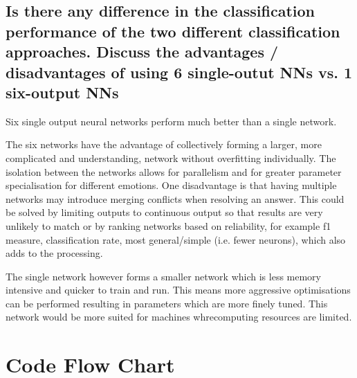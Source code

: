\documentclass[11pt]{article}
\begin{document}
\subsection{Is there any difference in the classification performance of the two different classification approaches. Discuss the advantages / disadvantages of using 6 single-outut NNs vs. 1 six-output NNs}

Six single output neural networks perform much better than a single network. 

The six networks have the advantage of collectively forming a larger, more complicated and understanding, network without overfitting individually. The isolation between the networks allows for parallelism and for greater parameter specialisation for different emotions. One disadvantage is that having multiple networks may introduce merging conflicts when resolving an answer. This could be solved by limiting outputs to continuous output so that results are very unlikely to match or by ranking networks based on reliability, for example f1 measure, classification rate, most general/simple (i.e. fewer neurons), which also adds to the processing.

The single network however forms a smaller network which is less memory intensive and quicker to train and run. This means more aggressive optimisations can be performed resulting in parameters which are more finely tuned. This network would be more suited for machines whrecomputing resources are limited.

\section{Code Flow Chart}
\end{document}
